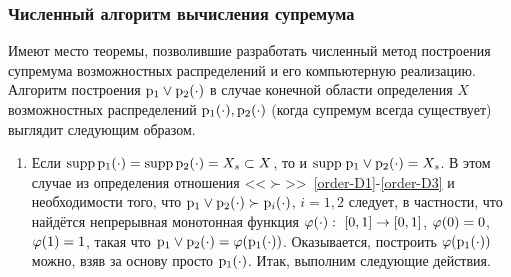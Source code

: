 \subsubsection{Численный алгоритм вычисления супремума}
\label{algo_sup_poss}

Имеют место теоремы, позволившие разработать численный метод построения супремума возможностных распределений и его компьютерную реализацию. Алгоритм построения ${\mathrm{p}}_1 \vee{\mathrm{p}}_2(\cdot)$ в случае конечной области определения $X$ возможностных распределений ${\mathrm{p}}_1(\cdot), {\mathrm{p}}_2(\cdot)$ (когда супремум всегда существует) выглядит следующим образом.
\begin{enumerate}
	\item 
		Если ${\mathrm{supp}}\,{\mathrm{p}}_1(\cdot) = {\mathrm{supp}}\,{\mathrm{p}}_2(\cdot) = X_s \subset X$, то и ${\mathrm{supp}} \; {\mathrm{p}}_1 \vee{\mathrm{p}}_2(\cdot) = X_s$. В этом случае из определения отношения <<$\succ$>>~\ref{order-D1}-\ref{order-D3} и необходимости того, что ${\mathrm{p}}_1 \vee{\mathrm{p}}_2(\cdot) \succ {\mathrm{p}}_i(\cdot)$, $i=1,2$ следует, в частности, что найдётся непрерывная монотонная функция ${\varphi(\cdot):\ [0,1]\to[0,1]}$, $\varphi(0) = 0$, $\varphi(1) = 1$, такая что ${\mathrm{p}}_1 \vee{\mathrm{p}}_2(\cdot) = \varphi({\mathrm{p}}_1(\cdot))$. Оказывается, построить $\varphi({\mathrm{p}}_1(\cdot))$ можно, взяв за основу просто ${\mathrm{p}}_1(\cdot)$. Итак, выполним следующие действия.  %

\end{enumerate}
